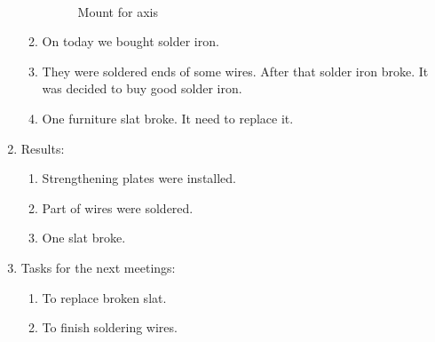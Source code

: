 \begin{enumerate}
\begin{enumerate}
\begin{figure}[H]
\begin{minipage}[h]{0.29\linewidth}
			\end{minipage}
			\hfill
			\begin{minipage}[h]{0.2\linewidth}
				\center  
			\end{minipage}
			\caption{Mount for axis}
		\end{figure}
		
		\item On today we bought solder iron.
		
        \item They were soldered ends of some wires. After that solder iron broke. It was decided to buy good solder iron.
        
        \item One furniture slat broke. It need to replace it.

	\end{enumerate}
	
	\item Results:
	\begin{enumerate}
		
		\item Strengthening plates were installed.
		
		\item Part of wires were soldered.
		
		\item One slat broke.
		
	\end{enumerate}
	
	\item Tasks for the next meetings:
	\begin{enumerate}
		
		\item To replace broken slat.
		
		\item To finish soldering wires.
			
	\end{enumerate}
\end{enumerate}
\fillpage
